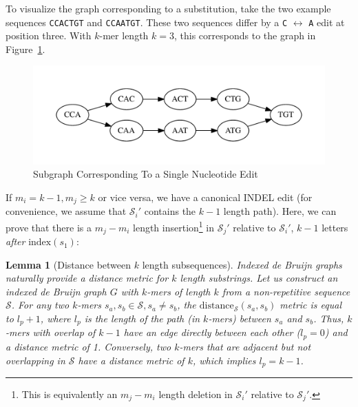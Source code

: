 \documentclass{bioinfo}
\newtheorem{lemma}{Lemma}
\begin{document}
\begin{methods}
To visualize the graph corresponding to a substitution, take the two example sequences \texttt{CCACTGT}
and \texttt{CCAATGT}. These two sequences differ by a \texttt{C} $\leftrightarrow$ \texttt{A} edit at
position three. With $k$-mer length $k = 3$, this corresponds to the graph in Figure~\ref{fig:sne}.

\begin{figure}[h]
\begin{center}
\includegraphics[width=0.95\linewidth, clip=true, trim=0 39 0 39]{graphs/sne.pdf}
\end{center}
\caption{Subgraph Corresponding To a Single Nucleotide Edit}
\label{fig:sne}
\end{figure}

If $m_i = k - 1, m_j \ge k$ or vice versa, we have a canonical INDEL edit (for convenience, we assume
that $\mathcal{S}_i'$ contains the $k - 1$ length path). Here, we can prove that there is a $m_j - m_i$
length insertion\footnote{This is equivalently an $m_j - m_i$ length deletion in $\mathcal{S}_i'$ relative to
$\mathcal{S}_j'$.} in $\mathcal{S}_j'$ relative to $\mathcal{S}_i'$, $k - 1$ letters \emph{after}
$\text{index}(s_1)$:

\begin{lemma}[Distance between $k$ length subsequences]
\label{lem:minimum-distance}
\emph{Indexed de Bruijn} graphs naturally provide a distance metric for $k$ length substrings. Let us construct an
indexed de Bruijn graph $G$ with $k$-mers of length $k$ from a non-repetitive sequence $\mathcal{S}$.
For any two $k$-mers $s_a, s_b \in \mathcal{S}, s_a \ne s_b$, the
$\text{distance}_\mathcal{S}(s_a, s_b)$ metric is equal to $l_p + 1$, where $l_p$ is the length of the
path (in $k$-mers) between $s_a$ and $s_b$. Thus, $k$-mers with overlap of $k - 1$ have an edge
directly between each other ($l_p = 0$) and a distance metric of 1. Conversely, two $k$-mers that are
adjacent but not overlapping in $\mathcal{S}$ have a distance metric of $k$, which implies $l_p = k - 1$.
\end{lemma}


\end{methods}
\end{document}
